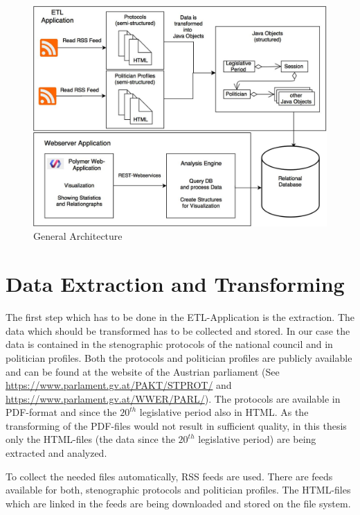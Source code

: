 \begin{figure}
	\centering
	\includegraphics[width=\textwidth]{imgs/overall_architecture}
	\caption{General Architecture}
	\label{fig:general_architecture}
\end{figure}

\section{Data Extraction and Transforming}
\label{sec:data_extraction_transforming}
The first step which has to be done in the ETL-Application is the extraction. The data which should be transformed has to be collected and stored. In our case the data is contained in the stenographic protocols of the national council and in politician profiles. Both the protocols and politician profiles are publicly available and can be found at the website of the Austrian parliament (See \url{https://www.parlament.gv.at/PAKT/STPROT/} and \url{https://www.parlament.gv.at/WWER/PARL/}). The protocols are available in PDF-format and since the $20^{th}$ legislative period also in HTML. As the transforming of the PDF-files would not result in sufficient quality, in this thesis only the HTML-files (the data since the $20^{th}$ legislative period) are being extracted and analyzed.

To collect the needed files automatically, RSS feeds are used. There are feeds available for both, stenographic protocols and politician profiles. The HTML-files which are linked in the feeds are being downloaded and stored on the file system.

